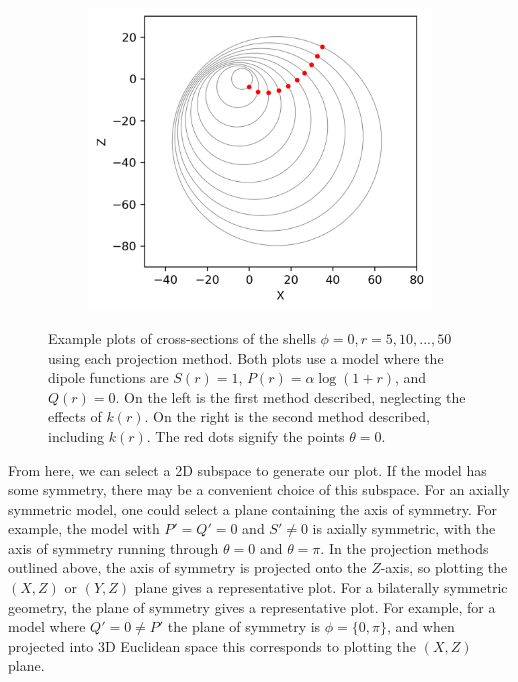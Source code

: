 \documentclass[a4paper,12pt]{report}
\begin{document}
\begin{figure}[!tbh]
\begin{subfigure}[b]{0.45\textwidth}
         \includegraphics[width=\textwidth]{example plot curvature.png}
     \end{subfigure}
      \caption{Example plots of cross-sections of the shells $\phi=0, r=5,10, ... , 50$ using each projection method. Both plots use a model where the dipole functions are $S(r)=1$, $P(r)=\alpha\log(1+r)$, and $Q(r)=0$. On the left is the first method described, neglecting the effects of $k(r)$. On the right is the second method described, including $k(r)$. The red dots signify the points $\theta=0$.}
      \label{fig: szekeres - projection examples}
\end{figure}

From here, we can select a 2D subspace to generate our plot. If the model has some symmetry, there may be a convenient choice of this subspace. For an axially symmetric model, one could select a plane containing the axis of symmetry. For example, the model with $P'=Q'=0$ and $S' \neq 0$ is axially symmetric, with the axis of symmetry running through $\theta=0$ and $\theta = \pi$. In the projection methods outlined above, the axis of symmetry is projected onto the $Z$-axis, so plotting the $(X,Z)$ or $(Y,Z)$ plane gives a representative plot. For a bilaterally symmetric geometry, the plane of symmetry gives a representative plot. For example, for a model where $Q'=0\neq P'$ the plane of symmetry is $\phi=\{0,\pi\}$, and when projected into 3D Euclidean space this corresponds to plotting the $(X,Z)$ plane.
\end{document}
